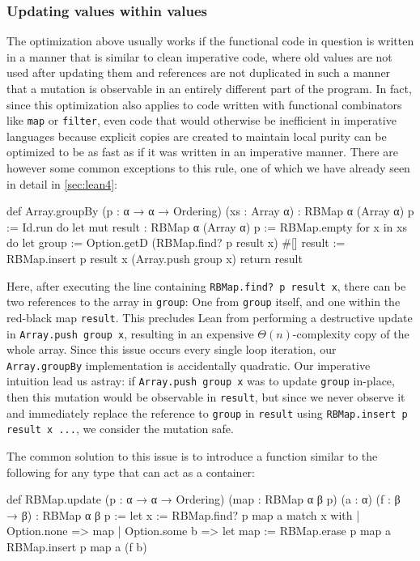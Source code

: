 \subsubsection{Updating values within values}
The optimization above usually works if the functional code in question is written in a manner that is similar to clean imperative code, where old values are not used after updating them and references are not duplicated in such a manner that a mutation is observable in an entirely different part of the program. In fact, since this optimization also applies to code written with functional combinators like \lstinline|map| or \lstinline|filter|, even code that would otherwise be inefficient in imperative languages because explicit copies are created to maintain local purity can be optimized to be as fast as if it was written in an imperative manner. There are however some common exceptions to this rule, one of which we have already seen in detail in \cref{sec:lean4}:\\
\begin{code}
def Array.groupBy (p : α → α → Ordering) (xs : Array α)
  : RBMap α (Array α) p := Id.run do
  let mut result : RBMap α (Array α) p := RBMap.empty
  for x in xs do
    let group := Option.getD (RBMap.find? p result x) #[]
    result := RBMap.insert p result x (Array.push group x)
  return result
\end{code}

Here, after executing the line containing \lstinline|RBMap.find? p result x|, there can be two references to the array in \lstinline|group|: One from \lstinline|group| itself, and one within the red-black map \lstinline|result|. This precludes Lean from performing a destructive update in \lstinline|Array.push group x|, resulting in an expensive $\Theta(n)$-complexity copy of the whole array. Since this issue occurs every single loop iteration, our \lstinline|Array.groupBy| implementation is accidentally quadratic. Our imperative intuition lead us astray: if \lstinline|Array.push group x| was to update \lstinline|group| in-place, then this mutation would be observable in \lstinline|result|, but since we never observe it and immediately replace the reference to \lstinline|group| in \lstinline|result| using \lstinline|RBMap.insert p result x ...|, we consider the mutation safe. 

The common solution to this issue is to introduce a function similar to the following for any type that can act as a container:\\
\begin{code}
def RBMap.update (p : α → α → Ordering) (map : RBMap α β p) 
  (a : α) (f : β → β) : RBMap α β p :=
  let x := RBMap.find? p map a
  match x with
  | Option.none   => map
  | Option.some b => 
    let map := RBMap.erase p map a
    RBMap.insert p map a (f b)
\end{code}

